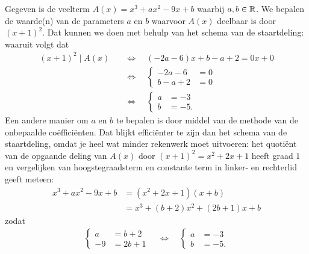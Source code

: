 \documentclass{ximera}
\begin{document}
\begin{example}
Gegeven is de veelterm $A(x) = x^3 + ax^2 - 9x + b$ waarbij $a,b \in \mathbb{R}$. We bepalen de waarde(n) van de parameters $a$ en $b$ waarvoor $A(x)$ deelbaar is door $(x+1)^2$. Dat kunnen we doen met behulp van het schema van de staartdeling: 
waaruit volgt dat  
\begin{align*}
(x+1)^2 \mid A(x) \quad 
& \Leftrightarrow \quad (-2a-6)x+b-a+2 = 0x + 0 \\
& \Leftrightarrow \quad
\left\{ 
\begin{aligned}
-2a-6 & = 0 \\
b-a+2 & = 0 
\end{aligned}
\right. \\ 
& \Leftrightarrow \quad
\left\{ 
\begin{aligned}
a & = -3 \\
b & = -5. 
\end{aligned}
\right.
\end{align*} 
Een andere manier om $a$ en $b$ te bepalen is door middel van de methode van de onbepaalde co\"effici\"enten. Dat blijkt effici\"enter te zijn dan het schema van de staartdeling, omdat je heel wat minder rekenwerk moet uitvoeren: het quoti\"ent van de opgaande deling van $A(x)$ door $(x+1)^2 = x^2 + 2x + 1$ heeft graad $1$ en vergelijken van hoogstegraadsterm en constante term in linker- en rechterlid geeft meteen:
\begin{align*}
x^3 + ax^2 - 9x + b 
& = (x^2 + 2x + 1)(x + b) \\
& = x^3 + (b+2)x^2 + (2b+1)x + b
\end{align*}
zodat 
\begin{align*}
\left\{ 
\begin{aligned}
a & = b+2 \\
-9 & = 2b+1
\end{aligned}
\right. 
\quad \Leftrightarrow \quad
\left\{ 
\begin{aligned}
a & = -3 \\
b & = -5. 
\end{aligned}
\right.
\end{align*}
\end{example}
\end{document}
